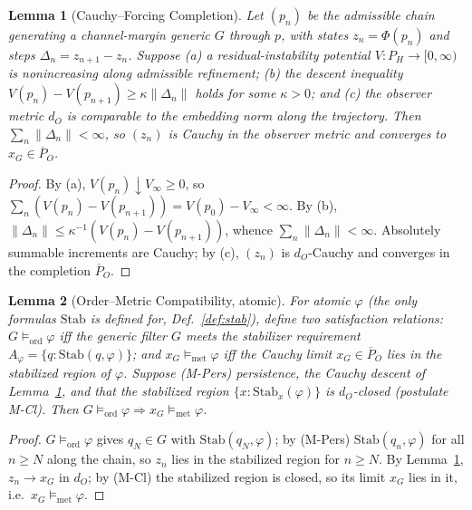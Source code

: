\documentclass[11pt]{article}
\newtheorem{lemma}{Lemma}
\theoremstyle{definition}
\theoremstyle{remark}
\newcommand{\Stab}{\mathrm{Stab}}
\begin{document}
\begin{lemma}[Cauchy--Forcing Completion]\label{lem:cauchy}
Let $(p_n)$ be the admissible chain generating a channel-margin generic $G$ through $p$, with states
$z_n=\Phi(p_n)$ and steps $\Delta_n=z_{n+1}-z_n$. Suppose (a) a residual-instability potential
$V:P_H\to[0,\infty)$ is nonincreasing along admissible refinement; (b) the descent inequality
$V(p_n)-V(p_{n+1})\ge\kappa\|\Delta_n\|$ holds for some $\kappa>0$; and (c) the observer metric
$d_O$ is comparable to the embedding norm along the trajectory. Then $\sum_n\|\Delta_n\|<\infty$,
so $(z_n)$ is Cauchy in the observer metric and converges to $x_G\in\overline{P}_O$.
\end{lemma}

\begin{proof}
By (a), $V(p_n)\downarrow V_\infty\ge0$, so $\sum_n(V(p_n)-V(p_{n+1}))=V(p_0)-V_\infty<\infty$.
By (b), $\|\Delta_n\|\le\kappa^{-1}(V(p_n)-V(p_{n+1}))$, whence $\sum_n\|\Delta_n\|<\infty$.
Absolutely summable increments are Cauchy; by (c), $(z_n)$ is $d_O$-Cauchy and converges in the
completion $\overline{P}_O$.
\end{proof}

\begin{lemma}[Order--Metric Compatibility, atomic]\label{lem:ordmet}
For \emph{atomic} $\varphi$ (the only formulas $\Stab$ is defined for, Def.~\ref{def:stab}), define
two satisfaction relations: $G\models_{\mathrm{ord}}\varphi$ iff the generic filter $G$ meets
the stabilizer requirement $A_\varphi=\{q:\Stab(q,\varphi)\}$; and $x_G\models_{\mathrm{met}}\varphi$ iff the
Cauchy limit $x_G\in\overline{P}_O$ lies in the stabilized region of $\varphi$. Suppose (M-Pers)
persistence, the Cauchy descent of Lemma~\ref{lem:cauchy}, and that the stabilized region
$\{x:\Stab_x(\varphi)\}$ is $d_O$-closed (postulate M-Cl). Then
$G\models_{\mathrm{ord}}\varphi\Rightarrow x_G\models_{\mathrm{met}}\varphi$.
\end{lemma}

\begin{proof}
$G\models_{\mathrm{ord}}\varphi$ gives $q_N\in G$ with $\Stab(q_N,\varphi)$; by (M-Pers)
$\Stab(q_n,\varphi)$ for all $n\ge N$ along the chain, so $z_n$ lies in the stabilized region for
$n\ge N$. By Lemma~\ref{lem:cauchy}, $z_n\to x_G$ in $d_O$; by (M-Cl) the stabilized region is closed,
so its limit $x_G$ lies in it, i.e.\ $x_G\models_{\mathrm{met}}\varphi$.
\end{proof}
\end{document}
